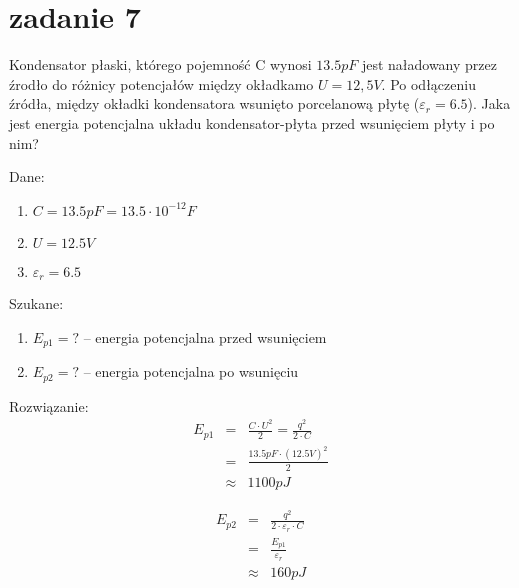 \documentclass[svgnames]{report}
\begin{document}
\section{zadanie 7}
\begin{framed}
Kondensator płaski, którego pojemność C wynosi $13.5pF$ jest naładowany przez źrodło do różnicy potencjałów między okładkamo $U = 12,5V$.
Po odłączeniu źródła, między okładki kondensatora wsunięto porcelanową płytę ($\varepsilon_r = 6.5$).
Jaka jest energia potencjalna układu kondensator-płyta przed wsunięciem płyty i po nim?
\end{framed}
Dane:
\begin{enumerate}
	\item $C = 13.5pF = 13.5 \cdot 10^{-12}F$
	\item $U = 12.5V$
	\item $\varepsilon_r = 6.5$
\end{enumerate}
Szukane:
\begin{enumerate}
	\item $E_{p1} = ?$	-- energia potencjalna przed wsunięciem
	\item $E_{p2} = ?$	-- energia potencjalna po wsunięciu
\end{enumerate}
Rozwiązanie:
\begin{eqnarray*}
E_{p1}	&=&	\frac{C \cdot U^2}{2}	= \frac{q^2}{2 \cdot C}	\\
		&=&	\frac{13.5 pF \cdot (12.5V)^2}{2}	\\
		& \approx &	1100 pJ
\end{eqnarray*}

\begin{eqnarray*}
E_{p2}	&=& \frac{q^2}{2 \cdot \varepsilon_r \cdot C}	\\
		&=& \frac{E_{p1}}{\varepsilon_r}	\\
		& \approx & 160 pJ	\\
\end{eqnarray*}
\end{document}
